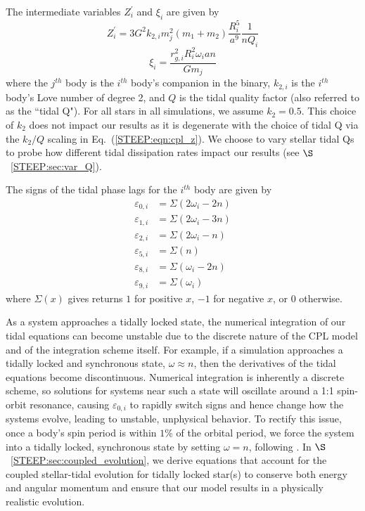The intermediate variables $Z_i^{'}$ and $\xi_i$ are given by
\begin{equation} \label{STEEP:eqn:cpl_z}
Z_i^{'} = 3 G^2 k_{2,i} m_j^2 (m_1 + m_2) \frac{R_i^5}{a^9} \frac{1}{n Q_i}
\end{equation}
\begin{equation} \label{STEEP:eqn:cpl_xi}
\xi_i = \frac{r_{g,i}^2 R_i^2 \omega_i a n}{G m_j}
\end{equation}
where the $j^{th}$ body is the $i^{th}$ body's companion in the binary, $k_{2,i}$ is the $i^{th}$ body's Love number of degree 2, and $Q$ is the tidal quality factor (also referred to as the ``tidal Q").  For all stars in all simulations, we assume $k_2 = 0.5$.  This choice of $k_2$ does not impact our results as it is degenerate with the choice of tidal Q via the $k_2/Q$ scaling in Eq.~(\ref{STEEP:eqn:cpl_z}).  We choose to vary stellar tidal Qs to probe how different tidal dissipation rates impact our results (see $\S$~\ref{STEEP:sec:var_Q}).

The signs of the tidal phase lags for the $i^{th}$ body are given by
\begin{equation} \label{STEEP:eqn:cpl_eps}
\begin{split}
\varepsilon_{0,i} & = \Sigma(2 \omega_i - 2n) \\
\varepsilon_{1,i} & = \Sigma(2 \omega_i - 3n) \\
\varepsilon_{2,i} & = \Sigma(2 \omega_i - n) \\
\varepsilon_{5,i} & = \Sigma(n) \\
\varepsilon_{8,i} & = \Sigma(\omega_i - 2n) \\
\varepsilon_{9,i} & = \Sigma(\omega_i)
\end{split}
\end{equation}
where $\Sigma(x)$ gives returns $1$ for positive $x$, $-1$ for negative $x$, or $0$ otherwise.

As a system approaches a tidally locked state, the numerical integration of our tidal equations can become unstable due to the discrete nature of the CPL model and of the integration scheme itself.  For example, if a simulation approaches a tidally locked and synchronous state, $\omega \approx n$, then the derivatives of the tidal equations become discontinuous.  Numerical integration is inherently a discrete scheme, so solutions for systems near such a state will oscillate around a 1:1 spin-orbit resonance, causing $\varepsilon_{0,i}$ to rapidly switch signs and hence change how the systems evolve, leading to unstable, unphysical behavior.  To rectify this issue, once a body's spin period is within $1\%$ of the orbital period, we force the system into a tidally locked, synchronous state by setting $\omega = n$, following \citet{Barnes2013}.  In $\S$~\ref{STEEP:sec:coupled_evolution}, we derive equations that account for the coupled stellar-tidal evolution for tidally locked star(s) to conserve both energy and angular momentum and ensure that our model results in a physically realistic evolution.

